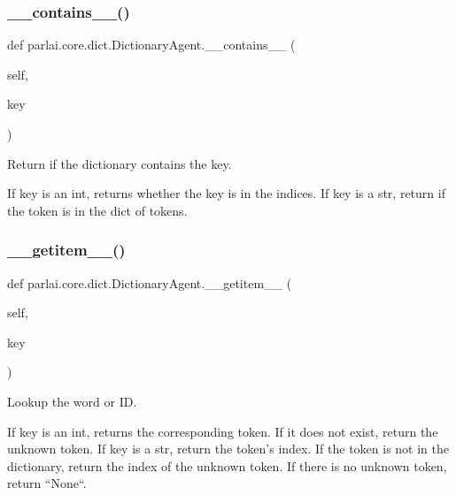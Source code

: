 \subsubsection{\texorpdfstring{\+\_\+\+\_\+contains\+\_\+\+\_\+()}{\_\_contains\_\_()}}
{\footnotesize\ttfamily def parlai.\+core.\+dict.\+Dictionary\+Agent.\+\_\+\+\_\+contains\+\_\+\+\_\+ (\begin{DoxyParamCaption}\item[{}]{self,  }\item[{}]{key }\end{DoxyParamCaption})}

\begin{DoxyVerb}Return if the dictionary contains the key.

If key is an int, returns whether the key is in the indices. If key is a str,
return if the token is in the dict of tokens.
\end{DoxyVerb}
 \mbox{\label{classparlai_1_1core_1_1dict_1_1DictionaryAgent_a82a64989f1750412b6ffd9a4270953b3}} 
\subsubsection{\texorpdfstring{\+\_\+\+\_\+getitem\+\_\+\+\_\+()}{\_\_getitem\_\_()}}
{\footnotesize\ttfamily def parlai.\+core.\+dict.\+Dictionary\+Agent.\+\_\+\+\_\+getitem\+\_\+\+\_\+ (\begin{DoxyParamCaption}\item[{}]{self,  }\item[{}]{key }\end{DoxyParamCaption})}

\begin{DoxyVerb}Lookup the word or ID.

If key is an int, returns the corresponding token. If it does not exist, return
the unknown token. If key is a str, return the token's index. If the token is
not in the dictionary, return the index of the unknown token. If there is no
unknown token, return ``None``.
\end{DoxyVerb}
 \mbox{\label{classparlai_1_1core_1_1dict_1_1DictionaryAgent_a1c686bb8b03cf09dbd43943d268c2410}} 
